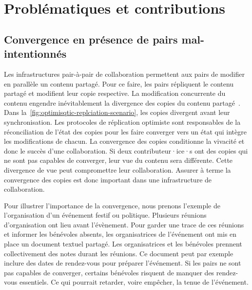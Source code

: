 \section{Problématiques et contributions}\label{sec:problematic}


\subsection{Convergence en présence de pairs mal-intentionnés}

Les infrastructures pair-à-pair de collaboration permettent aux pairs de modifier en parallèle un contenu partagé.
Pour ce faire, les pairs répliquent le contenu partagé et modifient leur copie respective.
La modification concurrente du contenu engendre inévitablement la divergence des copies du contenu partagé~\autocite{dourish_1995_divergence}.
Dans la~\autoref{fig:optimisqtic-replciation-scenario}, les copies divergent avant leur synchronisation.
Les protocoles de réplication optimiste sont responsables de la réconciliation de l'état des copies pour les faire converger vers un état qui intègre les modifications de chacun.
La convergence des copies conditionne la vivacité et donc le succès d'une collaboration.
Si deux contributeur·ice·s ont des copies qui ne sont pas capables de converger, leur vue du contenu sera différente.
Cette divergence de vue peut compromettre leur collaboration.
Assurer à terme la convergence des copies est donc important dans une infrastructure de collaboration.

Pour illustrer l'importance de la convergence, nous prenons l'exemple de l'organisation d'un événement festif ou politique.
Plusieurs réunions d'organisation ont lieu avant l'évènement.
Pour garder une trace de ces réunions et informer les bénévoles absents, les organisatrices de l'événement ont mis en place un document textuel partagé.
Les organisatrices et les bénévoles prennent collectivement des notes durant les réunions.
Ce document peut par exemple inclure des dates de rendez-vous pour préparer l'événement.
Si les pairs ne sont pas capables de converger, certains bénévoles risquent de manquer des rendez-vous essentiels.
Ce qui pourrait retarder, voire empêcher, la tenue de l'événement.

